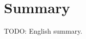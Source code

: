 \chapter{Summary}
\begin{ChapterAbstractNoTitle}
\end{ChapterAbstractNoTitle}

TODO: English summary.
